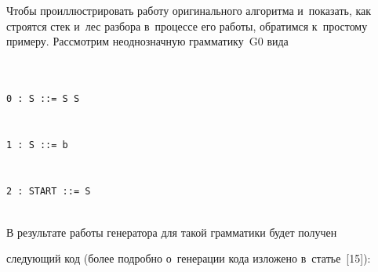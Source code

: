 Чтобы проиллюстрировать работу оригинального алгоритма и~показать, как строятся стек и~лес разбора в~процессе его работы, обратимся к~простому примеру. Рассмотрим неоднозначную грамматику~G0 вида


\begin{verbatim}


0 : S ::= S S


1 : S ::= b


2 : START ::= S


\end{verbatim}





В результате работы генератора для такой грамматики будет получен


следующий код (более подробно о~генерации кода изложено в~статье~[15]):


